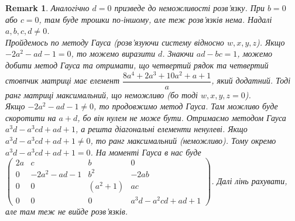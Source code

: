 \documentclass[a4paper, 10pt]{article}
\theoremstyle{theoremdd}
\theoremstyle{theoremdd}
\theoremstyle{theoremdd}
\theoremstyle{theoremdd}
\theoremstyle{theoremdd}
\theoremstyle{theoremdd}
\theoremstyle{theoremdd}
\theoremstyle{theoremdd}
\theoremstyle{theoremdd}
\theoremstyle{theoremdd}
\theoremstyle{theoremdd}
\newtheorem{remark}[theorem]{Remark}
\theoremstyle{theoremdd}
\theoremstyle{theoremdd}
\theoremstyle{theoremdd}
\theoremstyle{theoremdd}
\begin{document}
\begin{remark}
Аналогічно $d = 0$ призведе до неможливості розв'язку. При $b = 0$ або $c = 0$, там буде трошки по-іншому, але теж розв'язків нема. Надалі $a,b,c,d \neq 0$.\\
Пройдемось по методу Гауса (розв'язуючи систему відносно $w,x,y,z$). Якщо $-2a^2 -ad - 1 = 0$, то можемо виразити $d$. Знаючи $ad - bc = 1$, можемо добити метод Гауса та отримати, що четвертий рядок та четвертий стовпчик матриці має елемент $\dfrac{8a^4+2a^3+10a^2+a+1}{a}$, який додатний. Тоді ранг матриці максимальний, що неможливо (бо тоді $w,x,y,z = 0$).\\
Якщо $-2a^2 - ad - 1 \neq 0$, то продовжимо метод Гауса. Там можливо буде скоротити на $a + d$, бо він нулем не може бути. Отримаємо методом Гауса $a^3d - a^3cd + ad + 1$, а решта діагональні елементи ненулеві. Якщо $a^3d - a^3cd + ad + 1 \neq 0$, то ранг максимальний (неможливо). Тому окремо $a^3d - a^3cd + ad + 1 = 0$. На моменті Гауса в нас буде $\begin{pmatrix}
2a & c & b & 0 \\
0 & -2a^2-ad-1 & b^2 & -2ab \\
0 & 0 & (a^2+1) & ac \\
0 & 0 & 0 & a^3d - a^2cd +ad +1
\end{pmatrix}$. Далі лінь рахувати, але там теж не вийде розв'язків.
\fi
\iffalse
$\begin{pmatrix}
2a & c & b & 0 \\
b & a+d & 0 & b \\
c & 0 & a+d & c \\
0 & c & b & 2d
\end{pmatrix} \sim \begin{pmatrix}
2a & c & b & 0 \\
0 & cb - 2a(a+d) & b^2 & -2ab \\
0 & c^2 & bc-2a(a+d) & -2ac \\ 
0 & c & b & 2d
\end{pmatrix} \sim \\
\sim \begin{pmatrix}
2a & c & b & 0 \\
0 & -2a^2-ad-1 & b^2 & -2ab \\
0 & c^2 & -2a^2-ad-1 & -2ac \\ 
0 & c & b & 2d
\end{pmatrix} \sim \\
\sim \begin{pmatrix}
2a & c & b & 0 \\
0 & -2a^2-ad-1 & b^2 & -2ab \\
0 & 0 & (a+d)(a^2+1) & ac(a+d) \\
0 & 0 & ad(a+d) & (a+d)(ad+1)
\end{pmatrix} \sim \\
\sim \begin{pmatrix}
2a & c & b & 0 \\
0 & -2a^2-ad-1 & b^2 & -2ab \\
0 & 0 & (a^2+1) & ac \\
0 & 0 & 0 & a^3d - a^2cd +ad +1
\end{pmatrix}$.\\
\fi
\end{remark}
\end{document}
